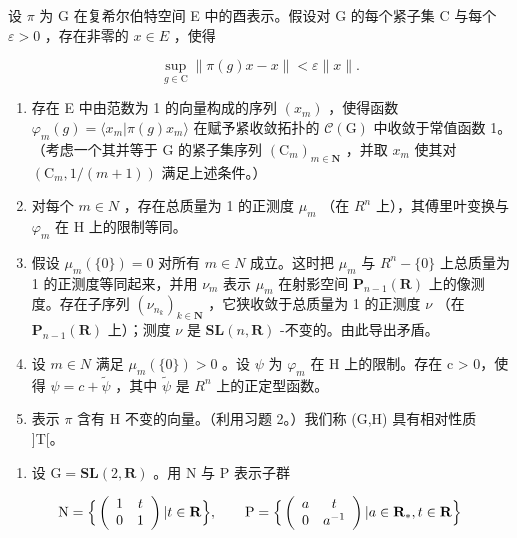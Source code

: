 设 \(\pi\) 为 G 在复希尔伯特空间 E 中的酉表示。假设对 G 的每个紧子集 C 与每个 \(\varepsilon > 0\) ，存在非零的 \(x \in E\) ，使得

\[
\sup _ {g \in \mathrm{C}} \| \pi (g) x - x \| <   \varepsilon \| x \|.
\]

\begin{enumerate}
\def\labelenumi{\alph{enumi})}
\item
  存在 E 中由范数为 1 的向量构成的序列 \((x_{m})\) ，使得函数 \(\varphi_{m}(g)=\langle x_{m}|\pi(g)x_{m}\rangle\) 在赋予紧收敛拓扑的 \(\mathcal{C}(\mathrm{G})\) 中收敛于常值函数 1。（考虑一个其并等于 G 的紧子集序列 \((\mathrm{C}_{m})_{m\in\mathbf{N}}\) ，并取 \(x_{m}\) 使其对 \((\mathrm{C}_{m},1/(m+1))\) 满足上述条件。）
\item
  对每个 \(m \in N\) ，存在总质量为 1 的正测度 \(\mu_{m}\) （在 \(R^{n}\) 上），其傅里叶变换与 \(\varphi_{m}\) 在 H 上的限制等同。
\item
  假设 \(\mu_{m}(\{0\}) = 0\) 对所有 \(m \in N\) 成立。这时把 \(\mu_{m}\) 与 \(R^{n} - \{0\}\) 上总质量为 1 的正测度等同起来，并用 \(\nu_{m}\) 表示 \(\mu_{m}\) 在射影空间 \(\mathbf{P}_{n-1}(\mathbf{R})\) 上的像测度。存在子序列 \((\nu_{n_{k}})_{k \in \mathbf{N}}\) ，它狭收敛于总质量为 1 的正测度 \(\nu\) （在 \(\mathbf{P}_{n-1}(\mathbf{R})\) 上）；测度 \(\nu\) 是 \(\mathbf{SL}(n, \mathbf{R})\) -不变的。由此导出矛盾。
\item
  设 \(m \in N\) 满足 \(\mu_{m}(\{0\}) > 0\) 。设 \(\psi\) 为 \(\varphi_{m}\) 在 H 上的限制。存在 c > 0，使得 \(\psi = c + \widetilde{\psi}\) ，其中 \(\widetilde{\psi}\) 是 \(R^{n}\) 上的正定型函数。
\item
  表示 \(\pi\) 含有 H 不变的向量。（利用习题 2。）我们称 (G,H) 具有相对性质 ]T[。
\end{enumerate}

\begin{enumerate}
\def\labelenumi{\arabic{enumi})}
\setcounter{enumi}{17}
\tightlist
\item
  设 \(\mathrm{G} = \mathbf{SL}(2, \mathbf{R})\) 。用 N 与 P 表示子群
\end{enumerate}

\[
\mathrm{N} = \Big \{\left( \begin{array}{c c} 1 & t \\ 0 & 1 \end{array} \right) | t \in \mathbf {R} \Big \}, \qquad \mathrm{P} = \Big \{\left( \begin{array}{c c} a & t \\ 0 & a ^ {- 1} \end{array} \right) | a \in \mathbf {R} _ {*}, t \in \mathbf {R} \Big \}
\]

